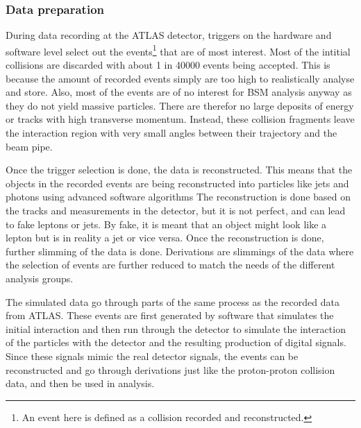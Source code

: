 \subsubsection*{Data preparation}
During data recording at the ATLAS detector, triggers on the hardware and software level select out the 
events\footnote{An event here is defined as a collision recorded and reconstructed.} that are of 
most interest. Most of the intitial collisions are discarded with about 1 in 40000 events being 
accepted. This is because the amount of recorded events simply are too 
 high to realistically analyse and store. Also, most of the events are of no interest for BSM 
 analysis anyway as they do not yield massive particles. There are therefor no large deposits 
 of energy or tracks with high transverse momentum. Instead, these collision fragments leave 
 the interaction region with very small angles between their trajectory and the beam pipe. \par
 Once the trigger selection is done, the data is reconstructed. This means that the objects in 
 the recorded events are being reconstructed into particles like jets and photons using advanced 
 software algorithms The reconstruction is done based on the tracks and measurements in the detector, 
 but it is not perfect, and can lead to fake leptons or jets. By fake, it is meant that an object 
 might look like a lepton but is in reality a jet or vice versa\cite{Gillam:2015kta}.
 Once the reconstruction is done, further slimming of the data is done. Derivations are slimmings 
 of the data where the selection of events are further reduced to match the needs of the different 
 analysis groups. \par 
 The simulated data go through parts of the same process as the recorded data from ATLAS. These 
 events are first generated by software that simulates the initial interaction and then run through 
 the detector to simulate the interaction of the particles with the detector and the resulting 
 production of digital signals. Since these signals mimic the real detector signals, the events can 
 be reconstructed and go through derivations just like the proton-proton collision data, 
and then be used in analysis. 

